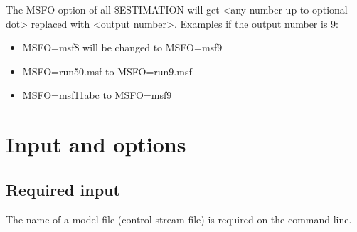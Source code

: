 \noindent The MSFO option of all \$ESTIMATION will get <any number up to optional dot> replaced with <output number>. 
Examples if the output number is 9:
\begin{itemize}
\item MSFO=msf8 will be changed to MSFO=msf9
\item MSFO=run50.msf to MSFO=run9.msf
\item MSFO=msf11abc to MSFO=msf9
\end{itemize}
\section{Input and options}

\subsection{Required input}
The name of a model file (control stream file) is required on the command-line.

